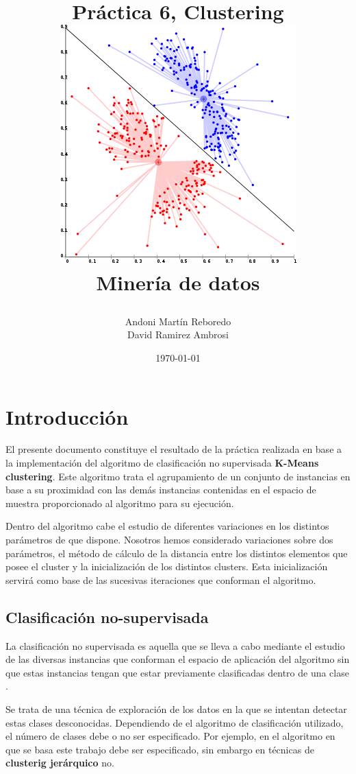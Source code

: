 \documentclass[a4paper]{report}
\author{Andoni Martín Reboredo \\ David Ramirez Ambrosi}
\title{\begin{center}
\textbf{\Huge{Práctica 6, Clustering}} \\ \includegraphics{./Figuras/KMeans-density-data.png}\\  \textbf{Minería de datos}
\end{center}}
\date{\today}
\begin{document}
\maketitle

\thispagestyle{empty}%
\newpage
\tableofcontents%
\thispagestyle{empty}
\newpage

\listoffigures%
\thispagestyle{empty}
\newpage

\setcounter{page}{1}%


\chapter{Introducción}

El presente documento constituye el resultado de la práctica realizada en base a la implementación del algoritmo de clasificación no supervisada \textbf{K-Means clustering}. Este algoritmo trata el agrupamiento de un conjunto de instancias en base a su proximidad con las demás instancias contenidas en el espacio de muestra proporcionado al algoritmo para su ejecución.

Dentro del algoritmo cabe el estudio de diferentes variaciones en los distintos parámetros de que dispone. Nosotros hemos considerado variaciones sobre dos parámetros, el método de cálculo de la distancia entre los distintos elementos que posee el cluster y la inicialización de los distintos clusters. Esta inicialización servirá como base de las sucesivas iteraciones que conforman el algoritmo.

	\section{Clasificación no-supervisada}
	
	La clasificación no supervisada es aquella que se lleva a cabo mediante el estudio de las diversas instancias que conforman el espacio de aplicación del algoritmo sin que estas instancias tengan que estar previamente clasificadas dentro de una clase \cite{clase}.
	
	Se trata de una técnica de exploración de los datos en la que se intentan detectar estas clases desconocidas. Dependiendo de el algoritmo de clasificación utilizado, el número de clases debe o no ser especificado. Por ejemplo, en el algoritmo en que se basa este trabajo debe ser especificado, sin embargo en técnicas de \textbf{clusterig jerárquico} no.
	
\end{document}
